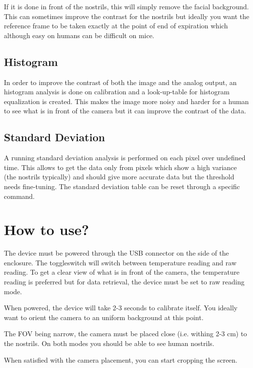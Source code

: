 \documentclass[a4paper]{article}
\begin{document}
If it is done in front of the nostrils, this will simply remove the facial background. This can sometimes improve the contrast for the nostrils but ideally you want the reference frame to be taken exactly at the point of end of expiration which although easy on humans can be difficult on mice.

\subsection{Histogram}
\label{histogram}
In order to improve the contrast of both the image and the analog output, an histogram analysis is done on calibration and a look-up-table for histogram equalization is created. This makes the image more noisy and harder for a human to see what is in front of the camera but it can improve the contrast of the data.

\subsection{Standard Deviation}
A running standard deviation analysis is performed on each pixel over undefined time. This allows to get the data only from pixels which show a high variance (the nostrils typically) and should give more accurate data but the threshold needs fine-tuning. The standard deviation table can be reset through a specific command.

\section{How to use?}
The device must be powered through the USB connector on the side of the enclosure.
The toggleswitch will switch between temperature reading and raw reading. To get a clear view of what is in front of the camera, the temperature reading is preferred but for data retrieval, the device must be set to raw reading mode.

When powered, the device will take 2-3 seconds to calibrate itself. You ideally want to orient the camera to an uniform background at this point. 

The FOV being narrow, the camera must be placed close (i.e. withing 2-3 cm) to the nostrils.
On both modes you should be able to see human nostrils.

When satisfied with the camera placement, you can start cropping the screen. 
\end{document}
